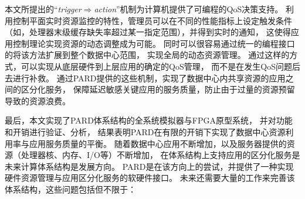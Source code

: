 本文所提出的``\emph{trigger$\Rightarrow$action}''机制为计算机提供了可编程的QoS决策支持。
利用控制平面实时资源监控的特性，管理员可以在不同的性能指标上设定触发条件
（如，处理器末级缓存缺失率超过某一指定范围），并得到实时的通知，
这使得应用控制理论实现资源的动态调整成为可能。
同时可以很容易通过统一的编程接口的将该方法扩展到整个数据中心范围，
实现全局的动态资源管理。
通过这样的方式，可以实现从底层硬件到上层应用的确定的QoS管理，
而不是在发生QoS问题后去进行补救。
通过PARD提供的这些机制，实现了数据中心内共享资源的应用之间的区分化服务，
保障延迟敏感关键应用的服务质量，防止由于过量的资源预留导致的资源浪费。

最后，本文实现了PARD体系结构的全系统模拟器与FPGA原型系统，
并对功能和开销进行验证、分析，
结果表明PARD在有限的开销下实现了数据中心资源利用率与应用服务质量的平衡。
随着数据中心应用不断增加，以及服务器提供的资源（处理器核、内存、I/O等）不断增加，
在体系结构上支持应用的区分化服务是未来计算体系结构是发展方向。
PARD是在该方向上的尝试，并提供了一种实现硬件资源管理与应用区分化服务的软硬件接口。
未来还需要大量的工作来完善该体系结构，这些问题包括但不限于：

